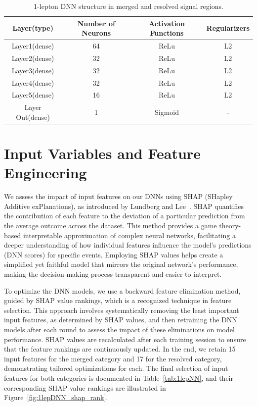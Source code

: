 \begin{table}[ht]
    \centering
    \begin{tabular}{c|c|c|c}
     Layer(type) & Number of Neurons & Activation Functions & Regularizers\\
     \hline
     \hline
     Layer1(dense) & 64 & ReLu & L2\\
     Layer2(dense) & 32 & ReLu & L2\\
     Layer3(dense) & 32 & ReLu & L2\\
     Layer4(dense) & 32 & ReLu & L2\\
     Layer5(dense) & 16 & ReLu & L2\\
     Layer Out(dense) & 1 & Sigmoid & -\\
    \end{tabular}
    \caption{1-lepton DNN structure in merged and resolved signal regions.}
    \label{tab:1lepDNN layers}
\end{table}

\section{Input Variables and Feature Engineering}
\label{input_variables}

We assess the impact of input features on our DNNs using SHAP (SHapley Additive exPlanations), as introduced by Lundberg and Lee~\cite{LundbergLee2017}. SHAP quantifies the contribution of each feature to the deviation of a particular prediction from the average outcome across the dataset. This method provides a game theory-based interpretable approximation of complex neural networks, facilitating a deeper understanding of how individual features influence the model's predictions (DNN scores) for specific events. Employing SHAP values helps create a simplified yet faithful model that mirrors the original network's performance, making the decision-making process transparent and easier to interpret.

To optimize the DNN models, we use a backward feature elimination method, guided by SHAP value rankings, which is a recognized technique in feature selection. This approach involves systematically removing the least important input features, as determined by SHAP values, and then retraining the DNN models after each round to assess the impact of these eliminations on model performance. SHAP values are recalculated after each training session to ensure that the feature rankings are continuously updated. In the end, we retain 15 input features for the merged category and 17 for the resolved category, demonstrating tailored optimizations for each.
The final selection of input features for both categories is documented in Table~\ref{tab:1lepNN}, and their corresponding SHAP value rankings are illustrated in Figure~\ref{fig:1lepDNN_shap_rank}.

